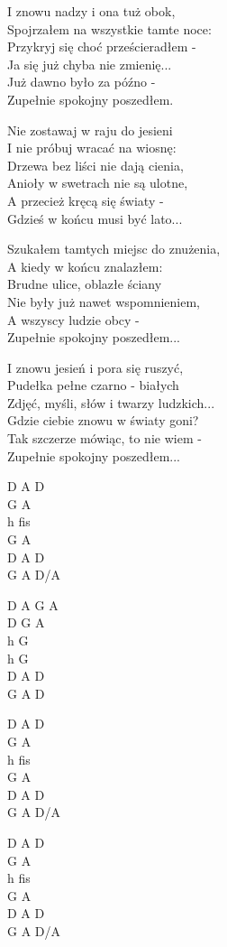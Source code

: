 \begin{text}
I znowu nadzy i ona tuż obok,\\
Spojrzałem na wszystkie tamte noce:\\
Przykryj się choć prześcieradłem -\\
Ja się już chyba nie zmienię...\\
Już dawno było za późno -\\
Zupełnie spokojny poszedłem.

\vin Nie zostawaj w raju do jesieni\\
\vin I nie próbuj wracać na wiosnę:\\
\vin Drzewa bez liści nie dają cienia,\\
\vin Anioły w swetrach nie są ulotne,\\
\vin A przecież kręcą się światy -\\
\vin Gdzieś w końcu musi być lato...

Szukałem tamtych miejsc do znużenia,\\
A kiedy w końcu znalazłem:\\
Brudne ulice, oblazłe ściany\\
Nie były już nawet wspomnieniem,\\
A wszyscy ludzie obcy -\\
Zupełnie spokojny poszedłem...

I znowu jesień i pora się ruszyć,\\
Pudełka pełne czarno - białych\\
Zdjęć, myśli, słów i twarzy ludzkich...\\
Gdzie ciebie znowu w światy goni?\\
Tak szczerze mówiąc, to nie wiem -\\
Zupełnie spokojny poszedłem...
\end{text}
\begin{chord}
    D A D\\
    G A\\
    h fis\\
    G A\\
    D A D\\
    G A D/A

    D A G A\\
    D G A\\
    h G\\
    h G\\
    D A D\\
    G A D

    D A D\\
    G A\\
    h fis\\
    G A\\
    D A D\\
    G A D/A

    D A D\\
    G A\\
    h fis\\
    G A\\
    D A D\\
    G A D/A
\end{chord}